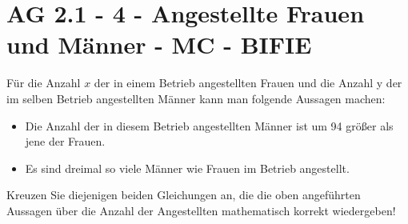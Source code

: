 \section{AG 2.1 - 4 - Angestellte Frauen und Männer - MC - BIFIE}

\begin{beispiel}[AG 2.1]{1} %
Für die Anzahl $x$ der in einem Betrieb angestellten Frauen und die Anzahl y der im selben Betrieb angestellten Männer kann man folgende Aussagen machen:
\begin{itemize}
	\item Die Anzahl der in diesem Betrieb angestellten Männer ist um 94 größer als jene der Frauen.
	\item Es sind dreimal so viele Männer wie Frauen im Betrieb angestellt.
\end{itemize}
	
	\leer
Kreuzen Sie diejenigen beiden Gleichungen an, die die oben angeführten Aussagen über die Anzahl der Angestellten mathematisch korrekt wiedergeben! 	
	
\end{beispiel}